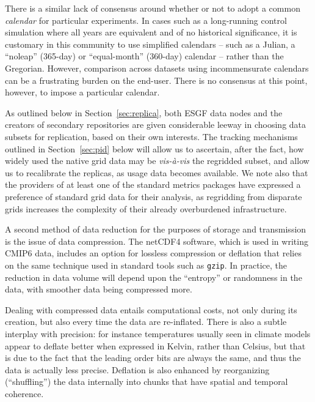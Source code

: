 \documentclass[gmd,manuscript]{copernicus}
\newcommand{\pllabel}[1]{\label{p-#1}\linelabel{l-#1}}
\begin{document}
There is a similar lack of consensus around whether or not to adopt a common \emph{calendar} for
particular experiments.
\pllabel{RC3-13}
In cases such as a long-running control simulation where all years are
equivalent and of no historical significance, it is customary in this
community to use simplified calendars -- such as a Julian, a
``noleap'' (365-day) or ``equal-month'' (360-day) calendar -- rather
than the Gregorian. However,
comparison across datasets using incommensurate calendars can be a
frustrating burden on the end-user. There is no consensus at this
point, however, to impose a particular calendar.

As outlined below in Section~\ref{sec:replica}, both ESGF data nodes
and the creators of secondary repositories are given considerable
leeway in choosing data subsets for replication, based on their own
interests. The tracking mechanisms outlined in Section~\ref{sec:pid}
below will allow us to ascertain, after the fact, how widely used the
native grid data may be \emph{vis-\`a-vis} the regridded subset, and
allow us to recalibrate the replicas, as usage data becomes available.
We note also that the providers of at least one of the standard
metrics packages \citep[ESMValTool,][]{ref:eyringetal2016a} have
expressed a preference of standard grid data for their analysis, as
regridding from disparate grids increases the complexity of their
already overburdened infrastructure.

A second method of data reduction for the purposes of storage and
transmission is the issue of data compression. The netCDF4 software, which is 
used in writing CMIP6 data, includes an option for lossless
compression or deflation \citep{ref:zivlempel1977} that relies on the
same technique used in standard tools such as \texttt{gzip}. In
practice, the reduction in data volume will depend upon the
``entropy'' or randomness in the data, with smoother data being
compressed more.

Dealing with compressed data entails computational costs, not only during 
its creation, but also every time the data are re-inflated. There
is also a subtle interplay with precision: for instance temperatures
usually seen in climate models appear to deflate better when expressed
in Kelvin, rather than Celsius, but that is due to the fact that the
leading order bits are always the same, and thus the data is actually
less precise. Deflation is also enhanced by reorganizing
(``shuffling'') the data internally into chunks that have spatial and
temporal coherence.
\end{document}
